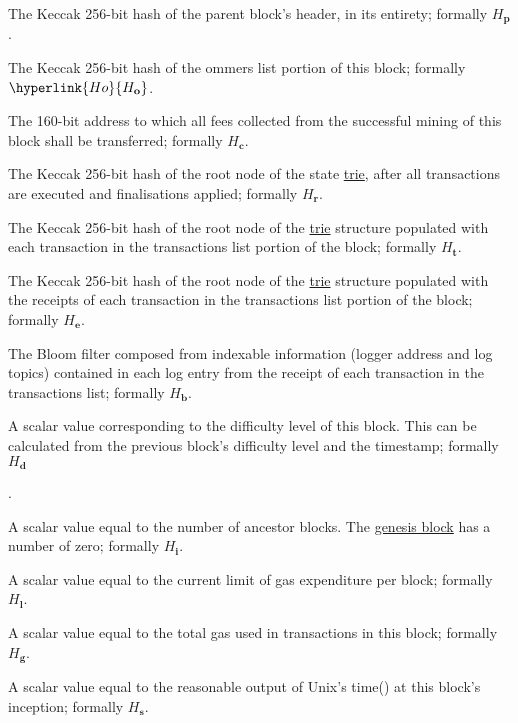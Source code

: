 \documentclass[9pt,oneside]{amsart}
\begin{document}
\begin{multicols}{2}
\begin{description}\hypertarget{H p}{
\item[parentHash] The Keccak 256-bit hash of the parent block's header, in its entirety; formally $H_\mathbf{p}$.}
\item[ommersHash] The Keccak 256-bit hash of the ommers list portion of this block; formally $\hyperlink{H o}{H_\mathbf{o}}$.\hypertarget{H c}{
\item[beneficiary] The 160-bit address to which all fees collected from the successful mining of this block shall be transferred; formally $H_\mathbf{c}$.}
\item[stateRoot] The Keccak 256-bit hash of the root node of the state \hyperlink{trie}{trie}, after all transactions are executed and finalisations applied; formally \hyperlink{H r}{$H_\mathbf{r}$}.
\item[transactionsRoot] The Keccak 256-bit hash of the root node of the \hyperlink{trie}{trie} structure populated with each transaction in the transactions list portion of the block; formally \hyperlink{H t}{$H_\mathbf{t}$}.
\item[receiptsRoot] The Keccak 256-bit hash of the root node of the \hyperlink{trie}{trie} structure populated with the receipts of each transaction in the transactions list portion of the block; formally \hyperlink{H e}{$H_\mathbf{e}$}.
\item[logsBloom] The Bloom filter composed from indexable information (logger address and log topics) contained in each log entry from the receipt of each transaction in the transactions list; formally \hyperlink{H b}{$H_\mathbf{b}.$}\hypertarget{H d}{
\item[difficulty] A scalar value corresponding to the difficulty level of this block. This can be calculated from the previous block's difficulty level and the timestamp; formally $H_\mathbf{d}$}.\hypertarget{H i}{
\item[number] A scalar value equal to the number of ancestor blocks. The \hyperlink{GenesisBlock}{genesis block} has a number of zero; formally $H_\mathbf{i}$.}\hypertarget{H l}{
\item[gasLimit] A scalar value equal to the current limit of gas expenditure per block; formally $H_\mathbf{l}$.}\hypertarget{H g}{
\item[gasUsed] A scalar value equal to the total gas used in transactions in this block; formally $H_\mathbf{g}$.}\hypertarget{H s}{
\item[timestamp] A scalar value equal to the reasonable output of Unix's time() at this block's inception; formally {$H_\mathbf{s}$}.}\hypertarget{H x}{
}
\end{description}
\end{multicols}
\end{document}
